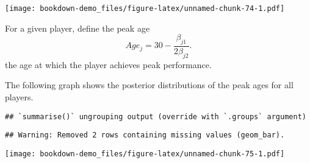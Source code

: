 \documentclass[
]{book}
\newenvironment{Shaded}{\begin{snugshade}}{\end{snugshade}}
\newcommand{\DataTypeTok}[1]{\textcolor[rgb]{0.13,0.29,0.53}{#1}}
\newcommand{\DecValTok}[1]{\textcolor[rgb]{0.00,0.00,0.81}{#1}}
\newcommand{\KeywordTok}[1]{\textcolor[rgb]{0.13,0.29,0.53}{\textbf{#1}}}
\newcommand{\NormalTok}[1]{#1}
\newcommand{\OperatorTok}[1]{\textcolor[rgb]{0.81,0.36,0.00}{\textbf{#1}}}
\newcommand{\StringTok}[1]{\textcolor[rgb]{0.31,0.60,0.02}{#1}}
\begin{document}
\texttt{[image: bookdown-demo\_files/figure-latex/unnamed-chunk-74-1.pdf]}

For a given player, define the peak age
\[
Age_j = 30 - \frac{\beta_{j1}}{2 \beta_{j2}}.
\]
the age at which the player achieves peak performance.

The following graph shows the posterior distributions of the peak ages for all players.

\begin{Shaded}
\end{Shaded}

\begin{verbatim}
## `summarise()` ungrouping output (override with `.groups` argument)
\end{verbatim}

\begin{verbatim}
## Warning: Removed 2 rows containing missing values (geom_bar).
\end{verbatim}

\texttt{[image: bookdown-demo\_files/figure-latex/unnamed-chunk-75-1.pdf]}

  
\end{document}
